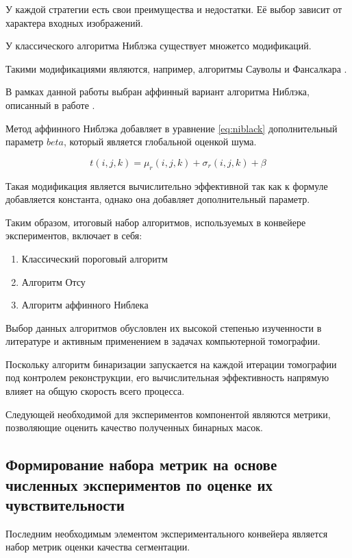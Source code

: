 У каждой стратегии есть свои преимущества и недостатки. Её выбор зависит от характера входных изображений.

У классического алгоритма Ниблэка существует множетсо модификаций.

Такими модификациями являются, например, алгоритмы Сауволы \cite{sauvola2000adaptive} и Фансалкара \cite{phansalkar2011adaptive}.

В рамках данной работы выбран аффинный вариант алгоритма Ниблэка, описанный в работе \cite{николаев2013критерии}.

Метод аффинного Ниблэка добавляет в уравнение \ref{eq:niblack} дополнительный параметр \(beta\), который является глобальной оценкой шума.

\begin{equation}\label{eq:niblack_affine}
    t(i, j, k) = \mu_r(i, j, k) + \sigma_r(i, j, k) + \beta
\end{equation}

Такая модификация является вычислительно эффективной так как к формуле добавляется константа, однако она добавляет дополнительный параметр. 

Таким образом, итоговый набор алгоритмов, используемых в конвейере экспериментов, включает в себя:

\begin{enumerate}
    \item Классический пороговый алгоритм
    \item Алгоритм Отсу
    \item Алгоритм аффинного Ниблека
\end{enumerate}

Выбор данных алгоритмов обусловлен их высокой степенью изученности в литературе и активным применением в задачах компьютерной томографии.

Поскольку алгоритм бинаризации запускается на каждой итерации томографии под контролем реконструкции, его вычислительная эффективность напрямую влияет на общую скорость всего процесса.

Следующей необходимой для экспериментов компонентой являются метрики, позволяющие оценить качество полученных бинарных масок.

\subsection{Формирование набора метрик на основе численных экспериментов по оценке их чувствительности}

Последним необходимым элементом экспериментального конвейера является набор метрик оценки качества сегментации.

